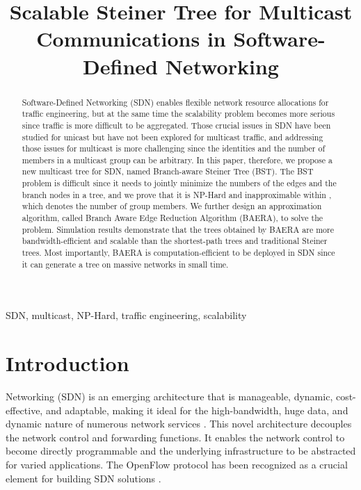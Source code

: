 \documentclass[conference]{IEEEtran}
\begin{document}
\title{Scalable Steiner Tree for Multicast Communications in Software-Defined Networking}



\author{
}

\maketitle

\begin{abstract}
Software-Defined Networking (SDN) enables flexible network resource
allocations for traffic engineering, but at the same time the scalability
problem becomes more serious since traffic is more difficult to be
aggregated. Those crucial issues in SDN have been studied for unicast but have not
been explored for multicast traffic, and addressing those issues for
multicast is more challenging since the identities and the number of
members in a multicast group can be arbitrary. In this paper, therefore, we
propose a new multicast tree for SDN, named Branch-aware Steiner Tree (BST).
The BST problem is difficult since it needs to jointly minimize the numbers of the edges and the branch nodes in a tree, and we prove that it is NP-Hard and
inapproximable within , which denotes the number of group members. We further
design an approximation algorithm, called Branch Aware Edge Reduction
Algorithm (BAERA), to solve the problem. Simulation results demonstrate that
the trees obtained by BAERA are more bandwidth-efficient and scalable than
the shortest-path trees and traditional Steiner trees. Most importantly,
BAERA is computation-efficient to be deployed in SDN since it can generate a
tree on massive networks in small time.
\end{abstract}


\begin{IEEEkeywords}
SDN, multicast, NP-Hard, traffic engineering, scalability
\end{IEEEkeywords}

\section{Introduction}

 Networking (SDN) is an emerging
architecture that is manageable, dynamic, cost-effective, and adaptable,
making it ideal for the high-bandwidth, huge data, and dynamic nature of
numerous network services  \cite{sdnwebsite}. This novel architecture decouples the network
control and forwarding functions. It enables the network control to become
directly programmable and the underlying infrastructure to be abstracted for
varied applications. The OpenFlow protocol has been recognized as a crucial
element for building SDN solutions \cite{sdnwebsite, McKeown2008, OpenFlow2013}.
\end{document}
